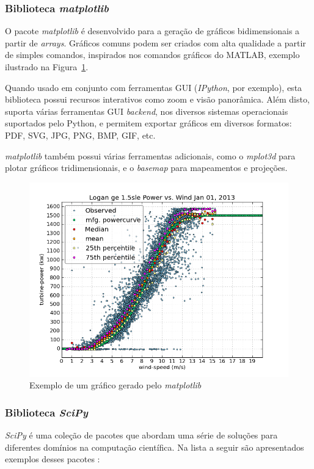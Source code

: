 \subsubsection{Biblioteca \textit{matplotlib}}
O pacote \textit{matplotlib} é desenvolvido para a geração de gráficos bidimensionais a partir de \textit{arrays}. Gráficos comuns podem ser criados com alta qualidade a partir de simples comandos, inspirados nos comandos gráficos do MATLAB, exemplo ilustrado na Figura~\ref{matplotlib-fig}.

Quando usado em conjunto com ferramentas GUI (\textit{IPython}, por exemplo), esta biblioteca possui recursos interativos como zoom e visão panorâmica. Além disto, suporta várias ferramentas GUI \textit{backend}, nos diversos sistemas operacionais suportados pelo Python, e permitem exportar gráficos em diversos formatos: PDF, SVG, JPG, PNG, BMP, GIF, etc.

\textit{matplotlib} também possui várias ferramentas adicionais, como o \textit{mplot3d} para plotar gráficos tridimensionais, e o \textit{basemap} para mapeamentos e projeções.

\begin{figure}[h!]
  \includegraphics[width=1\textwidth]{Cap4/imagens/matplotlib}
  \caption{Exemplo de um gráfico gerado pelo \textit{matplotlib}}
  \vspace{-0.3cm}
  \label{matplotlib-fig}
\end{figure}


\subsubsection{Biblioteca \textit{SciPy}}
\textit{SciPy} é uma coleção de pacotes que abordam uma série de soluções para diferentes domínios na computação científica. Na lista a seguir são apresentados exemplos desses pacotes \cite{python-analysis}:

